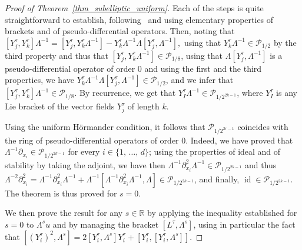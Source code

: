 \documentclass[AHL,Unicode,published]{cedram}
\newcommand*\R{\mathbb{R}}
\newcommand{\calP}{\mathcal{P}}
\DeclareMathOperator{\id}{id}
\begin{document}
\begin{proof}[Proof of Theorem~\ref{thm_subelliptic_uniform}]
Each of the steps is quite straightforward to establish, following~\cite{HelfferNier,Kohn1973} and using elementary properties of brackets and of pseudo-differential operators. Then, noting that $ [Y_j^\tau,Y_k^\tau]\Lambda^{-1} = [Y_j^\tau,Y_k^\tau\Lambda^{-1}] - Y_k^\tau\Lambda^{-1} \Lambda[Y_j^\tau,\Lambda^{-1}], $ using that $Y_k^\tau\Lambda^{-1}\in\calP_{1/2}$ by the third property and thus that $[Y_j^\tau,Y_k^\tau\Lambda^{-1}]\in\calP_{1/8}$, using that $\Lambda[Y_j^\tau,\Lambda^{-1}]$ is a pseudo-differential operator of order $0$ and using the first and the third properties, we have $Y_k^\tau\Lambda^{-1} \Lambda[Y_j^\tau,\Lambda^{-1}]\in\calP_{1/2}$, and we infer that $[Y_j^\tau,Y_k^\tau]\Lambda^{-1}\in\calP_{1/8}$. By recurrence, we get that $Y_I^\tau\Lambda^{-1}\in\calP_{1/2^{2k-1}}$, where $Y_I^\tau$ is any Lie bracket of the vector fields $Y_j^\tau$ of length $k$.

Using the uniform H\"ormander condition, it follows that $\calP_{1/2^{2r-1}}$ coincides with the ring of pseudo-differential operators of order $0$. Indeed, we have proved that $\Lambda^{-1} \partial_{x_i} \in \calP_{1/2^{2k-1}}$ for every $i\in\{1,\,\ldots,\,d\}$; using the properties of ideal and of stability by taking the adjoint, we have then $\Lambda^{-1} \partial_{x_i}^2 \Lambda^{-1} \in \calP_{1/2^{2k-1}}$ and thus $\Lambda^{-2} \partial_{x_i}^2 = \Lambda^{-1} \partial_{x_i}^2 \Lambda^{-1} + \Lambda^{-1} [\Lambda^{-1} \partial_{x_i}^2 \Lambda^{-1}, \Lambda] \in \calP_{1/2^{2k-1}}$, and finally, $\id \in \calP_{1/2^{2k-1}}$. The theorem is thus proved for $s=0$.

We then prove the result for any $s\in\R$ by applying the inequality established for $s=0$ to $\Lambda^s u$ and by managing the bracket $[L^\tau,\Lambda^s]$, using in particular the fact that $[(Y_i^\tau)^2,\Lambda^s] = 2[Y_i^\tau,\Lambda^s]Y_i^\tau+[Y_i^\tau,[Y_i^\tau,\Lambda^s]]$.
\end{proof}
\end{document}
